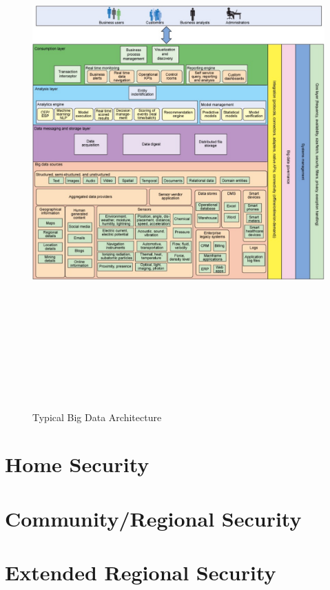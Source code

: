 \documentclass[sigconf]{acmart}
\begin{document}
\begin{figure}
\includegraphics[height=8in, width=7.5in]{images/BigDataArchitecture.pdf}
\caption{Typical Big Data Architecture}
\end{figure}
 
\section{Home Security}

\section{Community/Regional Security}

\section{Extended Regional Security}
\end{document}
